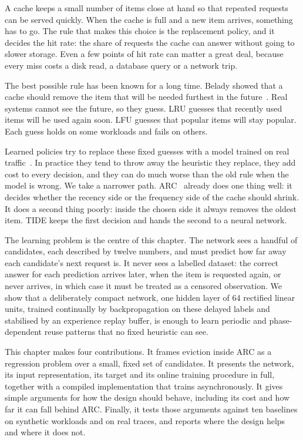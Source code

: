 \documentclass{llncs}
\begin{document}
A cache keeps a small number of items close at hand so that repeated requests can be served quickly. When the cache is full and a new item arrives, something has to go. The rule that makes this choice is the replacement policy, and it decides the hit rate: the share of requests the cache can answer without going to slower storage. Even a few points of hit rate can matter a great deal, because every miss costs a disk read, a database query or a network trip.

The best possible rule has been known for a long time. Belady showed that a cache should remove the item that will be needed furthest in the future~\cite{belady1966}. Real systems cannot see the future, so they guess. LRU guesses that recently used items will be used again soon. LFU guesses that popular items will stay popular. Each guess holds on some workloads and fails on others.

Learned policies try to replace these fixed guesses with a model trained on real traffic~\cite{song2020,liu2020}. In practice they tend to throw away the heuristic they replace, they add cost to every decision, and they can do much worse than the old rule when the model is wrong. We take a narrower path. ARC~\cite{megiddo2003} already does one thing well: it decides whether the recency side or the frequency side of the cache should shrink. It does a second thing poorly: inside the chosen side it always removes the oldest item. TIDE keeps the first decision and hands the second to a neural network.

The learning problem is the centre of this chapter. The network sees a handful of candidates, each described by twelve numbers, and must predict how far away each candidate's next request is. It never sees a labelled dataset: the correct answer for each prediction arrives later, when the item is requested again, or never arrives, in which case it must be treated as a censored observation. We show that a deliberately compact network, one hidden layer of 64 rectified linear units, trained continually by backpropagation on these delayed labels and stabilised by an experience replay buffer, is enough to learn periodic and phase-dependent reuse patterns that no fixed heuristic can see.

This chapter makes four contributions. It frames eviction inside ARC as a regression problem over a small, fixed set of candidates. It presents the network, its input representation, its target and its online training procedure in full, together with a compiled implementation that trains asynchronously. It gives simple arguments for how the design should behave, including its cost and how far it can fall behind ARC. Finally, it tests those arguments against ten baselines on synthetic workloads and on real traces, and reports where the design helps and where it does not.
\end{document}
